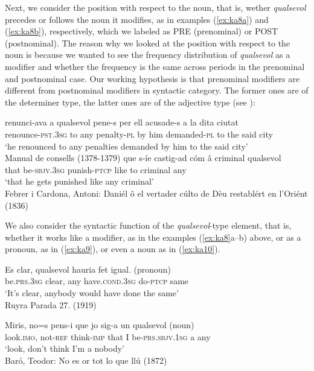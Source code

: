 \documentclass[output=paper,colorlinks,citecolor=brown]{langscibook}
\begin{document}
Next, we consider the position with respect to the noun, that is, wether \textit{qualsevol} precedes or follows the noun it modifies, as in examples (\ref{ex:ka8a}) and (\ref{ex:ka8b}), respectively, which we labeled as PRE (prenominal) or POST (postnominal). The reason why we looked at the position with respect to the noun is because we wanted to see the frequency distribution of \textit{qualsevol} as a modifier and whether the frequency is the same across periods in the prenominal and postnominal case. Our working hypothesis is that prenominal modifiers are different from postnominal modifiers in syntactic category. The former ones are of the determiner type, the latter ones are of the adjective type (see ):


\ea \label{ex:ka8}
\ea\label{ex:ka8a} \gll renunci-ava a qualsevol pene-s per ell acusade-s a la dita ciutat\\
        renounce-\textsc{pst.3sg} to any penalty-\textsc{pl} by him demanded-\textsc{pl} to the said city\\
    \glt ‘he renounced to any penalties demanded by him to the said city’\\
        Manual de consells (1378-1379)
\ex\label{ex:ka8b} \gll que s-íe castig-ad cóm â criminal qualsevol\\
        that be-\textsc{sbjv.3sg} punish-\textsc{ptcp} like to criminal any\\
    \glt‘that he gets punished like any criminal’\\
        Febrer i Cardona, Antoni: Daniél ô el vertader cúlto de Dèu restablért en l'Oriént (1836) \\
\z
\z

We also consider the syntactic function of the \textit{qualsevol}-type element, that is, whether it works like a modifier, as in the examples (\ref{ex:ka8}a--b) above, or as a pronoun, as in (\ref{ex:ka9}), or even a noun as in (\ref{ex:ka10}).

\ea \label{ex:ka9}
    \gll Es clar, qualsevol hauria fet igual. (pronoun)\\
    be.\textsc{prs.3sg} clear, any have.\textsc{cond.3sg} do-\textsc{ptcp} same\\
    \glt‘It’s clear, anybody would have done the same’\\
    Ruyra Parada 27. (1919)
    
\ex \label{ex:ka10}
\gll Miris, no=s pens-i que jo sig-a un qualsevol (noun)\\
    look.\textsc{imo}, not-\textsc{ref} think-\textsc{imp} that I be-\textsc{prs.sbjv.1sg} a any\\
    \glt‘look, don’t think I’m a nobody’\\
    Baró, Teodor: No es or tot lo que llú (1872)\\
\z
\end{document}
